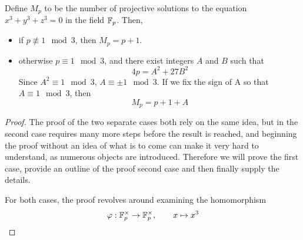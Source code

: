 
\begin{theorem}
Define $M_p$ to be the number of projective solutions to the equation $x^3 + y^3 + z^3 = 0$ in the field $\mathbb{F}_p$. Then,
\begin{itemize}
\item if $p \not\equiv 1 \mod{3}$, then $M_p = p + 1$.
\item otherwise $p \equiv 1 \mod{3}$, and there exist integers $A$ and $B$ such that
	$$4p = A^2 + 27B^2$$
	Since $A^2 \equiv 1 \mod{3}$, $A \equiv \pm1 \mod{3}$. If we fix the sign of A so that $A \equiv 1 \mod{3}$, then
	$$M_p = p + 1 + A$$
\end{itemize}
\end{theorem}

\begin{proof}
The proof of the two separate cases both rely on the same idea, but in the second case requires many more steps before the result is reached, and beginning the proof without an idea of what is to come can make it very hard to understand, as numerous objects are introduced. Therefore we will prove the first case, provide an outline of the proof second case and then finally supply the details.

For both cases, the proof revolves around examining the homomorphism
$$\varphi: \mathbb{F}_p^{\times} \rightarrow \mathbb{F}_p^{\times}, \qquad x \mapsto x^3$$
\end{proof}
